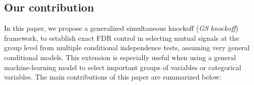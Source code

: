 \documentclass[11pt]{article}
\theoremstyle{plain}
\theoremstyle{definition}
\theoremstyle{remark}
\newcommand{\0}{\mathbf{0}}
\begin{document}


\subsection{Our contribution}
In this paper, we propose a generalized simultaneous knockoff (\textit{GS knockoff}) framework, to establish exact FDR control in selecting mutual signals at the group level from multiple conditional independence tests, assuming very general conditional models. This extension is especially useful when using a general machine-learning model to select important groups of variables or categorical variables. The main contributions of this paper are summarized below:
\end{document}

